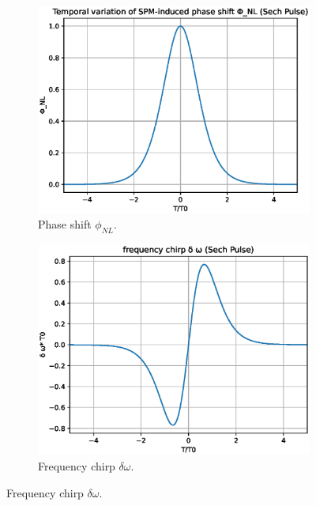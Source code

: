          \begin{figure}[label={fig:spmsech}, caption={Effect of SPM in a Sech pulse.}]
        \begin{subfigure}[b]{.53\textwidth}
		    \centering	
            \includegraphics[width=1\textwidth]{figures/chap3/shift_sech.eps}
            \caption{Phase shift $\phi_{NL}$.}
            \label{fig:shift}
        \end{subfigure}
        \hfill
        \begin{subfigure}[b]{.53\textwidth}
		    \centering	
            \includegraphics[width=1\textwidth]{figures/chap3/chirp_sech.eps}
            \caption{Frequency chirp $\delta \omega$.}
            \label{fig:chirp}
        \end{subfigure}
        \end{figure}
        
